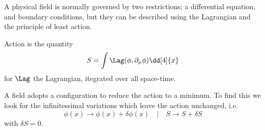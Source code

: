 A physical field is normally governed by two restrictions; a
differential equation, and boundary conditions, but they can be
described using the Lagrangian and the principle of least action.

\begin{definition}[Action]
  Action is the quantity
  \[ S = \int \Lag(\phi, \partial_\mu \phi) \dd[4]{x} \]
  for $\Lag$ the Lagrangian, itegrated over all space-time.
\end{definition}

A field adopts a configuration to reduce the action to a minimum. To
find this we look for the infinitessimal variations which leave the
action unchanged, i.e.
\begin{equation}
  \label{eq:1}
  \phi(x) \to \phi(x) + \delta \phi(x) \quad | \quad S \to S + \delta S 
\end{equation}
with $\delta S = 0$.


